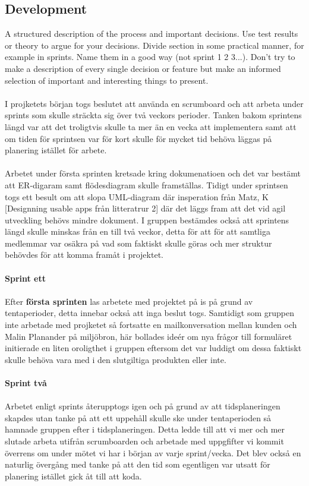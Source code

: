 \documentclass[12pt]{article}
\begin{document}
\subsection{Development}
A structured description of the process and important decisions. Use test results or theory to argue for your decisions. Divide section in some practical manner, for example in sprints. Name them in a good way (not sprint 1 2 3...). Don’t try to make a description of every single decision or feature but make an informed selection of important and interesting things to present.\\\\
I projketets början togs beslutet att använda en scrumboard och att arbeta under sprints som skulle sträckta sig över två veckors perioder. Tanken bakom sprintens längd var att det troligtvis skulle ta mer än en vecka att implementera samt att om tiden för sprintsen var för kort skulle för mycket tid behöva läggas på planering istället för arbete.\\\\
Arbetet under första sprinten kretsade kring dokumenatioen och det var bestämt att ER-digaram samt flödesdiagram skulle framställas. Tidigt under sprintsen togs ett besult om att slopa UML-diagram där insperation från Matz, K [Designning usable apps från litteratrur 2] där det läggs fram att det vid agil utveckling behövs mindre dokument. 
I gruppen bestämdes också att sprintens längd skulle minskas från en till två veckor, detta för att för att samtliga medlemmar var osäkra på vad som faktiskt skulle göras och mer struktur behövdes för att komma framåt i projektet. \\\\
\textbf{Sprint ett}\\\\
Efter \textbf{första sprinten} las arbetete med projektet på is på grund av tentaperioder, detta innebar också att inga beslut togs. Samtidigt som gruppen inte arbetade med projketet så fortsatte en mailkonversation mellan kunden och Malin Planander på miljöbron, här bollades ideér om nya frågor till formuläret initierade en liten oroligthet i gruppen eftersom det var luddigt om dessa faktiskt skulle behöva vara med i den slutgiltiga produkten eller inte.\\\\
\textbf{Sprint två}\\\\
Arbetet enligt sprints återupptogs igen och på grund av att tidsplaneringen skapdes utan tanke på att ett uppehåll skulle ske under tentaperioden så hamnade gruppen efter i tidsplaneringen. Detta ledde till att vi mer och mer slutade arbeta utifrån scrumboarden och arbetade med uppgfifter vi kommit överrens om under mötet vi har i början av varje sprint/vecka. Det blev också en naturlig övergång med tanke på att den tid som egentligen var utsatt för planering istället gick åt till att koda. \\\\
\end{document}
